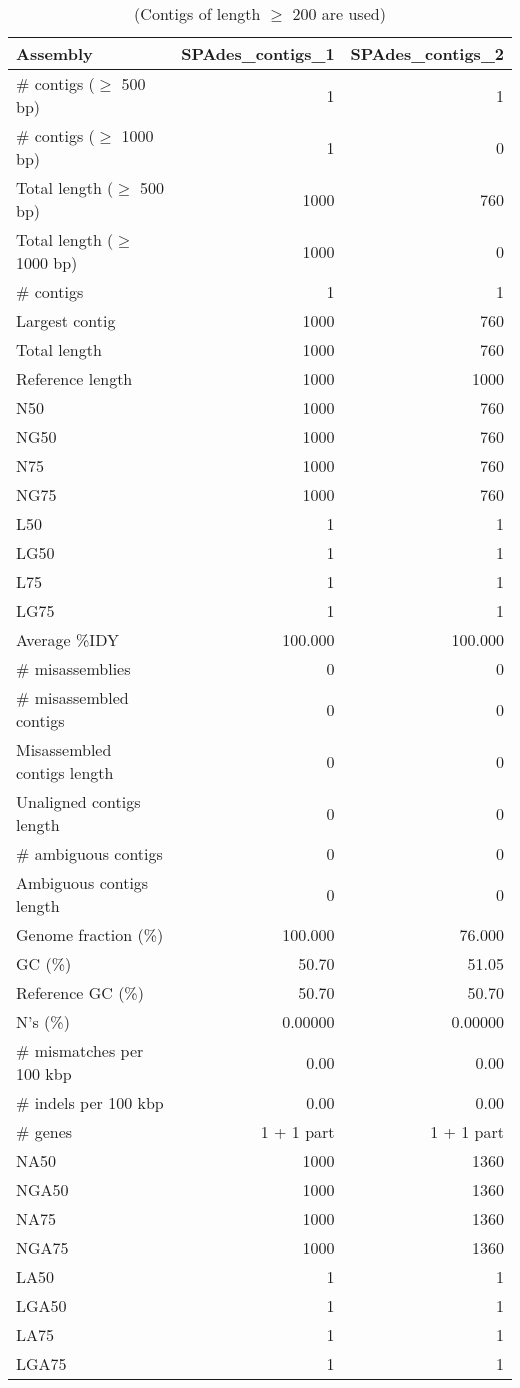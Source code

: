 \begin{table}[ht]
\begin{center}
\caption{(Contigs of length $\geq$ 200 are used)}
\begin{tabular}{|l*{2}{|r}|}
\hline
Assembly & SPAdes\_contigs\_1 & SPAdes\_contigs\_2 \\ \hline
\# contigs ($\geq$ 500 bp) & 1 & 1 \\ \hline
\# contigs ($\geq$ 1000 bp) & 1 & 0 \\ \hline
Total length ($\geq$ 500 bp) & 1000 & 760 \\ \hline
Total length ($\geq$ 1000 bp) & 1000 & 0 \\ \hline
\# contigs & 1 & 1 \\ \hline
Largest contig & 1000 & 760 \\ \hline
Total length & 1000 & 760 \\ \hline
Reference length & 1000 & 1000 \\ \hline
N50 & 1000 & 760 \\ \hline
NG50 & 1000 & 760 \\ \hline
N75 & 1000 & 760 \\ \hline
NG75 & 1000 & 760 \\ \hline
L50 & 1 & 1 \\ \hline
LG50 & 1 & 1 \\ \hline
L75 & 1 & 1 \\ \hline
LG75 & 1 & 1 \\ \hline
Average \%IDY & 100.000 & 100.000 \\ \hline
\# misassemblies & 0 & 0 \\ \hline
\# misassembled contigs & 0 & 0 \\ \hline
Misassembled contigs length & 0 & 0 \\ \hline
Unaligned contigs length & 0 & 0 \\ \hline
\# ambiguous contigs & 0 & 0 \\ \hline
Ambiguous contigs length & 0 & 0 \\ \hline
Genome fraction (\%) & 100.000 & 76.000 \\ \hline
GC (\%) & 50.70 & 51.05 \\ \hline
Reference GC (\%) & 50.70 & 50.70 \\ \hline
N's (\%) & 0.00000 & 0.00000 \\ \hline
\# mismatches per 100 kbp & 0.00 & 0.00 \\ \hline
\# indels per 100 kbp & 0.00 & 0.00 \\ \hline
\# genes & 1 + 1 part & 1 + 1 part \\ \hline
NA50 & 1000 & 1360 \\ \hline
NGA50 & 1000 & 1360 \\ \hline
NA75 & 1000 & 1360 \\ \hline
NGA75 & 1000 & 1360 \\ \hline
LA50 & 1 & 1 \\ \hline
LGA50 & 1 & 1 \\ \hline
LA75 & 1 & 1 \\ \hline
LGA75 & 1 & 1 \\ \hline
\end{tabular}
\end{center}
\end{table}
